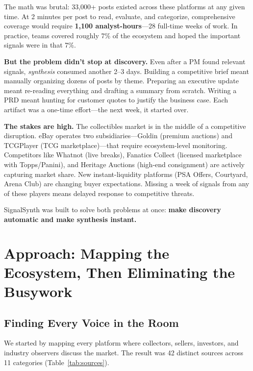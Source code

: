 \documentclass[11pt]{article}
\begin{document}
The math was brutal: 33,000+ posts existed across these platforms at any given time. At 2 minutes per post to read, evaluate, and categorize, comprehensive coverage would require \textbf{1,100 analyst-hours}---28 full-time weeks of work. In practice, teams covered roughly 7\% of the ecosystem and hoped the important signals were in that 7\%.

\textbf{But the problem didn't stop at discovery.} Even after a PM found relevant signals, \textit{synthesis} consumed another 2--3 days. Building a competitive brief meant manually organizing dozens of posts by theme. Preparing an executive update meant re-reading everything and drafting a summary from scratch. Writing a PRD meant hunting for customer quotes to justify the business case. Each artifact was a one-time effort---the next week, it started over.

\textbf{The stakes are high.} The collectibles market is in the middle of a competitive disruption. eBay operates two subsidiaries---Goldin (premium auctions) and TCGPlayer (TCG marketplace)---that require ecosystem-level monitoring. Competitors like Whatnot (live breaks), Fanatics Collect (licensed marketplace with Topps/Panini), and Heritage Auctions (high-end consignment) are actively capturing market share. New instant-liquidity platforms (PSA Offers, Courtyard, Arena Club) are changing buyer expectations. Missing a week of signals from any of these players means delayed response to competitive threats.

SignalSynth was built to solve both problems at once: \textbf{make discovery automatic and make synthesis instant.}

\section{Approach: Mapping the Ecosystem, Then Eliminating the Busywork}

\subsection{Finding Every Voice in the Room}
We started by mapping every platform where collectors, sellers, investors, and industry observers discuss the market. The result was 42 distinct sources across 11 categories (Table~\ref{tab:sources}).
\end{document}
